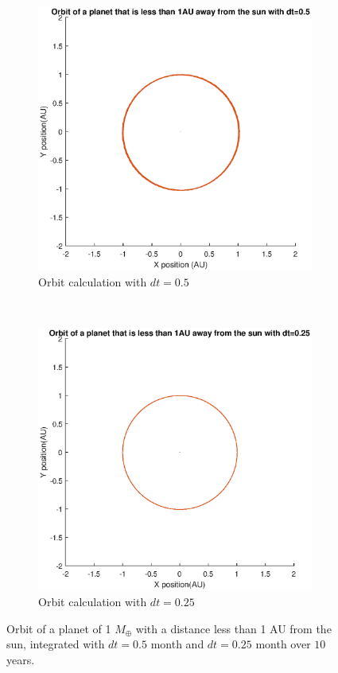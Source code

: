 \begin{figure}[H]
	\centering
	\begin{subfigure}{0.45\textwidth}
	\includegraphics[width=\textwidth]{Planeet_1AU_dt05_10jaar.eps}
	\caption{Orbit calculation with $dt=0.5$}
	\end{subfigure}
	~
	\begin{subfigure}{0.45\textwidth}
	\includegraphics[width=\textwidth]{Planeet_1AU_dt025_10jaar.eps}
	\caption{Orbit calculation with $dt=0.25$}
	\end{subfigure}
	\caption{Orbit of a planet of 1 $M_{\oplus}$ with a distance less than 1 AU from the sun, integrated with $dt=0.5$ month and $dt=0.25$ month over $10$ years.}
\end{figure} 

